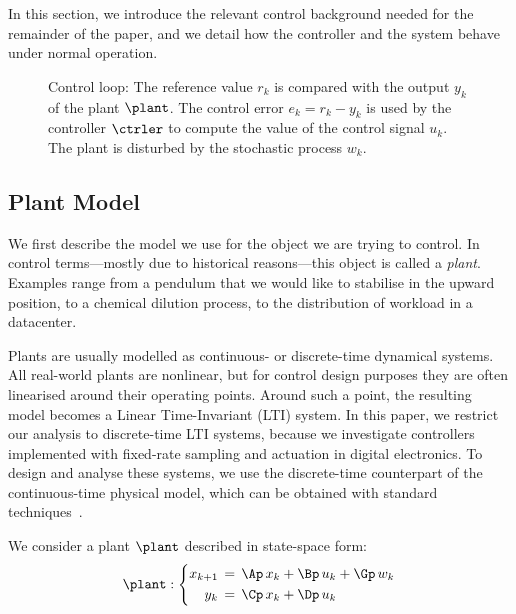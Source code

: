 In this section, we introduce the relevant control background needed for the remainder of the paper, and we detail how the controller and the system behave under normal operation.

\begin{figure}[t]
\centering

\caption{Control loop: The reference value $r_k$ is compared with the output $y_k$ of the plant $\plant$.
    The control error $e_k = r_k - y_k$ is used by the controller $\ctrler$ to compute the value of the control signal $u_k$.
    The plant is disturbed by the stochastic process $w_k$.}
\label{fig:loop}
\end{figure}

\subsection{Plant Model}

We first describe the model we use for the object we are trying to control.
In control terms---mostly due to historical reasons---this object is called a \emph{plant}.
Examples range from a pendulum that we would like to stabilise in the upward position, to a chemical dilution process, to the distribution of workload in a datacenter.

Plants are usually modelled as continuous- or discrete-time dynamical systems. 
All real-world plants are nonlinear, but for control design purposes they are often linearised around their operating points.
Around such a point, the resulting model becomes a Linear Time-Invariant (LTI) system.
In this paper, we restrict our analysis to discrete-time LTI systems, because we investigate controllers implemented with fixed-rate sampling and actuation in digital electronics.
To design and analyse these systems, we use the discrete-time counterpart of the continuous-time physical model, which can be obtained with standard techniques~\cite{Astrom:1997}.

We consider a plant $\plant$ described in state-space form:
\begin{equation}
\label{eq:background:plant}
    \plant : \left\{
    \begin{aligned}
        x_{k+1} &\,=\,  \Ap\,x_k + \Bp\,u_k + \Gp\,w_k \\
        y_k &\,=\, \Cp\,x_k + \Dp\,u_k
    \end{aligned}
    \right.
\end{equation}

